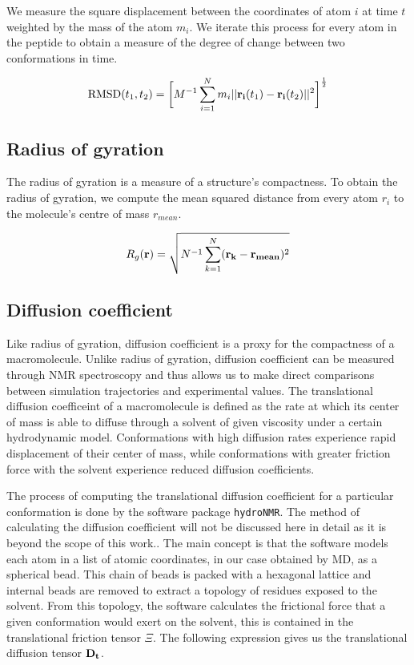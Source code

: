 We measure the square displacement between the coordinates of atom $i$ at time $t$ weighted by the mass of the atom $m_i$. We iterate this process for every atom in the peptide to obtain a measure of the degree of change between two conformations in time.

\begin{equation}
\text{RMSD}(t_1, t_2) = \bigg[ M^{-1} \sum_{i=1}^{N} m_{i} \lvert \lvert \mathbf{r_{i}}(t_{1}) - \mathbf{r_{i}}(t_{2}) \rvert \rvert^2 \bigg]^\frac{1}{2}
\end{equation}


\subsection{Radius of gyration}

The radius of gyration is a measure of a structure's compactness. To obtain the radius of gyration, we compute the mean squared distance from every atom $r_i$ to the molecule's centre of mass $r_{mean}$.

\begin{equation}
R_g(\mathbf{r}) = \sqrt{N^{-1} \sum_{k=1}^{N} (\mathbf{r_k} - \mathbf{r_{mean}})^2}
\end{equation}

\subsection{Diffusion coefficient}

Like radius of gyration, diffusion coefficient is a proxy for the compactness of a macromolecule. Unlike radius of gyration, diffusion coefficient can be measured through NMR spectroscopy and thus allows us to make direct comparisons between simulation trajectories and experimental values. The translational diffusion coefficeint of a macromolecule is defined as the rate at which its center of mass is able to diffuse through a solvent of given viscosity under a certain hydrodynamic model. Conformations with high diffusion rates experience rapid displacement of their center of mass, while conformations with greater friction force with the solvent experience reduced diffusion coefficients. 

The process of computing the translational diffusion coefficient for a particular conformation is done by the software package \texttt{hydroNMR}. The method of calculating the diffusion coefficient will not be discussed here in detail as it is beyond the scope of this work.. The main concept is that the software models each atom in a list of atomic coordinates, in our case obtained by MD, as a spherical bead. This chain of beads is packed with a hexagonal lattice and internal beads are removed to extract a topology of residues exposed to the solvent. From this topology, the software calculates the frictional force that a given conformation would exert on the solvent, this is contained in the translational friction tensor $\Xi$. The following expression gives us the translational diffusion tensor $\mathbf{D_t}$.

